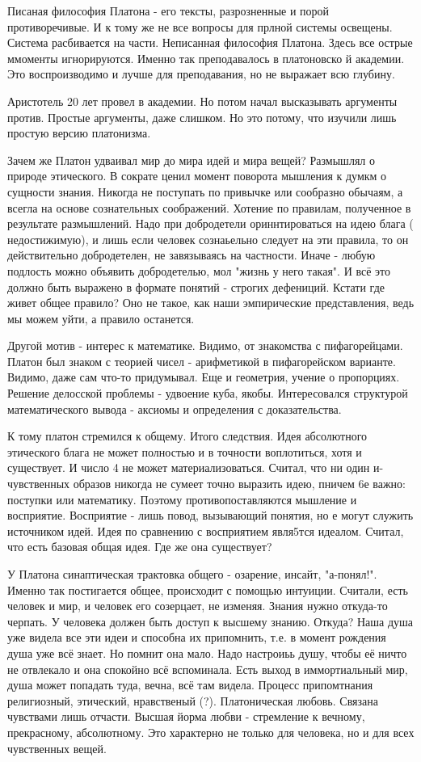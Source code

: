 Писаная философия Платона - его тексты, разрозненные и порой противоречивые. И к тому же не все вопросы для прлной системы освещены. Система расбивается на части.
Неписанная философия Платона. Здесь все острые ммоменты игнорируются. Именно так преподавалось в платоновско й академии. Это воспроизводимо и лучше для преподавания, но не выражает всю глубину.

Аристотель 20 лет провел в академии. Но потом начал высказывать аргументы против. Простые аргументы, даже слишком. Но это потому, что изучили лишь простую версию платонизма.

Зачем же Платон удваивал мир до мира идей и мира вещей?
Размышлял о природе этического. В сократе ценил момент поворота мышления к думкм о сущности знания. Никогда не поступать по привычке или сообразно обычаям, а всегла на основе сознательных соображений. Хотение по правилам, полученное в результате размышлений. Надо при добродетели ориннтироваться на идею блага ( недостижимую), и лишь если человек сознаьельно следует на эти правила, то он действительно добродетелен, не завязываясь на частности. Иначе - любую подлость можно объявить добродетелью, мол "жизнь у него такая". И всё это должно быть выражено в формате понятий - строгих дефениций. Кстати где живет общее правило? Оно не такое, как наши эмпирические представления, ведь мы можем уйти, а правило останется.

Другой мотив - интерес к математике. Видимо, от знакомства с пифагорейцами. Платон был знаком с теорией чисел - арифметикой в пифагорейском варианте. Видимо, даже сам что-то придумывал. Еще и геометрия, учение о пропорциях. Решение делосской проблемы - удвоение куба, якобы. Интересовался структурой математического вывода - аксиомы и определения с доказательства.

К тому платон стремился к общему. Итого следствия.
Идея абсолютного этического блага не может полностью и в точности воплотиться, хотя и существует. И число 4 не может материализоваться. Считал, что ни один и- чувственных образов никогда не сумеет точно выразить идею, пничем 6е важно: поступки или математику. Поэтому противопоставляются мышление и восприятие. Восприятие - лишь повод, вызывающий понятия, но е могут служить источником идей. Идея по сравнению с восприятием явля5тся идеалом. Считал, что есть базовая общая идея. Где же она существует?

У Платона синаптическая трактовка общего - озарение, инсайт, "а-понял!". Именно так постигается общее, происходит с помощью интуиции. Считали, есть человек и мир, и человек его  созерцает, не изменяя. Знания нужно откуда-то черпать. У человека должен быть доступ к высшему знанию. Откуда? Наша душа уже видела все эти идеи и способна их припомнить, т.е. в момент рождения душа уже всё знает. Но помнит она мало. Надо настроиьь душу, чтобы её ничто не отвлекало и она спокойно всё вспоминала.
Есть выход в иммортиальный мир, душа может попадать туда, вечна, всё там видела. Процесс припомтнания религиозный, этический, нравственый (?). Платоническая любовь. Связана чувствами лишь отчасти. Высшая йорма любви - стремление к вечному, прекрасному, абсолютному. Это характерно не только для человека, но и для всех чувственных вещей.
